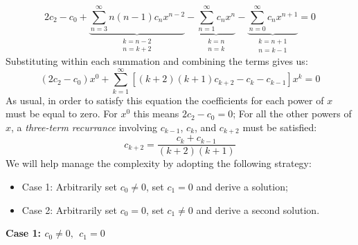 \begin{equation*}
2c_2 - c_0 + \underbrace{\sum\limits_{n=3}^{\infty}n(n-1)c_nx^{n-2}}_{\substack{k=n-2 \\ n=k+2}} - \underbrace{\sum\limits_{n=1}^{\infty} c_nx^n}_{\substack{k=n \\ n=k}} -\underbrace{\sum\limits_{n=0}^{\infty}c_nx^{n+1}}_{\substack{k=n+1 \\ n=k-1}} = 0
\end{equation*}
Substituting within each summation and combining the terms gives us:
\begin{equation*}
(2c_2-c_0)x^0 + \sum\limits_{k=1}^{\infty}\left[(k+2)(k+1)c_{k+2} - c_k - c_{k-1} \right]x^k = 0
\end{equation*}
As usual, in order to satisfy this equation the coefficients for each power of $x$ must be equal to zero.  For $x^0$ this means $2c_2 - c_0 = 0$;  For all the other powers of $x$, a \emph{three-term recurrance} involving $c_{k-1}$, $c_k$, and $c_{k+2}$ must be satisfied:
\begin{equation*}
c_{k+2} = \frac{c_k + c_{k-1}}{(k+2)(k+1)}
\end{equation*}
We will help manage the complexity by adopting the following strategy:
\begin{itemize}
\item Case 1: Arbitrarily set $c_0 \ne 0$, set $c_1 = 0$ and derive a solution;
\item Case 2: Arbitrarily set $c_0 = 0$, set $c_1 \ne 0$ and derive a second solution.
\end{itemize}

\vspace{0.5cm}

\noindent\textbf{Case 1: $c_0 \ne 0, \ \ c_1=0$}


